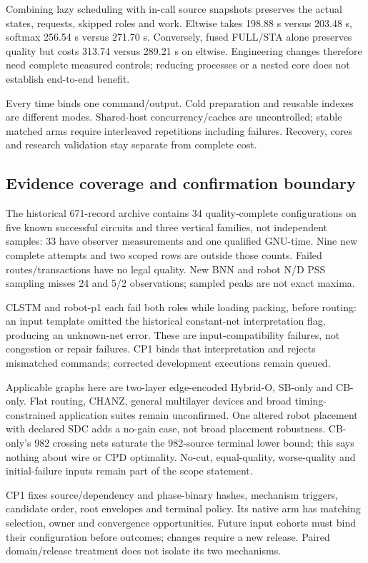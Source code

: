 \documentclass[conference,10pt]{IEEEtran}
\begin{document}
Combining lazy scheduling with in-call source snapshots preserves the actual states, requests, skipped roles and work. Eltwise takes 198.88 s versus 203.48 s, softmax 256.54 s versus 271.70 s. Conversely, fused FULL/STA alone preserves quality but costs 313.74 versus 289.21 s on eltwise. Engineering changes therefore need complete measured controls; reducing processes or a nested core does not establish end-to-end benefit.

Every time binds one command/output. Cold preparation and reusable indexes are different modes. Shared-host concurrency/caches are uncontrolled; stable matched arms require interleaved repetitions including failures. Recovery, cores and research validation stay separate from complete cost.

\subsection{Evidence coverage and confirmation boundary}
The historical 671-record archive contains 34 quality-complete configurations on five known successful circuits and three vertical families, not independent samples: 33 have observer measurements and one qualified GNU-time. Nine new complete attempts and two scoped rows are outside those counts. Failed routes/transactions have no legal quality. New BNN and robot N/D PSS sampling misses 24 and 5/2 observations; sampled peaks are not exact maxima.

CLSTM and robot-p1 each fail both roles while loading packing, before routing: an input template omitted the historical constant-net interpretation flag, producing an unknown-net error. These are input-compatibility failures, not congestion or repair failures. CP1 binds that interpretation and rejects mismatched commands; corrected development executions remain queued.

Applicable graphs here are two-layer edge-encoded Hybrid-O, SB-only and CB-only. Flat routing, CHANZ, general multilayer devices and broad timing-constrained application suites remain unconfirmed. One altered robot placement with declared SDC adds a no-gain case, not broad placement robustness. CB-only's 982 crossing nets saturate the 982-source terminal lower bound; this says nothing about wire or CPD optimality. No-cut, equal-quality, worse-quality and initial-failure inputs remain part of the scope statement.

CP1 fixes source/dependency and phase-binary hashes, mechanism triggers, candidate order, root envelopes and terminal policy. Its native arm has matching selection, owner and convergence opportunities. Future input cohorts must bind their configuration before outcomes; changes require a new release. Paired domain/release treatment does not isolate its two mechanisms.
\end{document}
